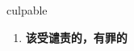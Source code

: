 
\begin{frame}
{\huge culpable}
\begin{center}
\begin{enumerate}\Large
  \item \textbf{该受谴责的，有罪的}
\end{enumerate}
\end{center}
\end{frame}
